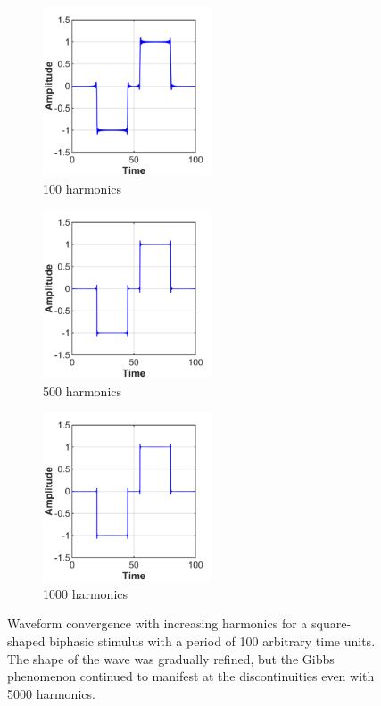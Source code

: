 \begin{figure}[p]
    \begin{subfigure}[t]{0.33\textwidth}
        \centering
        \includegraphics[width=5cm]{Simulations/TimeDep/square_biphasic_N100}
        \caption{100 harmonics}
        \label{fig:biphasic_conv_sq_100}
    \end{subfigure}%
    \hfill%
    \begin{subfigure}[t]{0.33\textwidth}
        \centering
        \includegraphics[width=5cm]{Simulations/TimeDep/square_biphasic_N500}
        \caption{500 harmonics}
        \label{fig:biphasic_conv_sq_500}
    \end{subfigure}%
    \hfill%
    \begin{subfigure}[t]{0.33\textwidth}
        \centering
        \includegraphics[width=5cm]{Simulations/TimeDep/square_biphasic_N1000}
        \caption{1000 harmonics}
        \label{fig:biphasic_conv_sq_1000}
    \end{subfigure}
    
	\caption[Waveform convergence for a square-shaped stimulus]{Waveform
	convergence with increasing harmonics for a square-shaped biphasic stimulus
	with a period of 100 arbitrary time units. The shape of the wave was gradually
	refined, but the Gibbs phenomenon continued to manifest at the
	discontinuities even with 5000 harmonics.}
	\label{fig:biphasic_conv_sq}
\end{figure}

